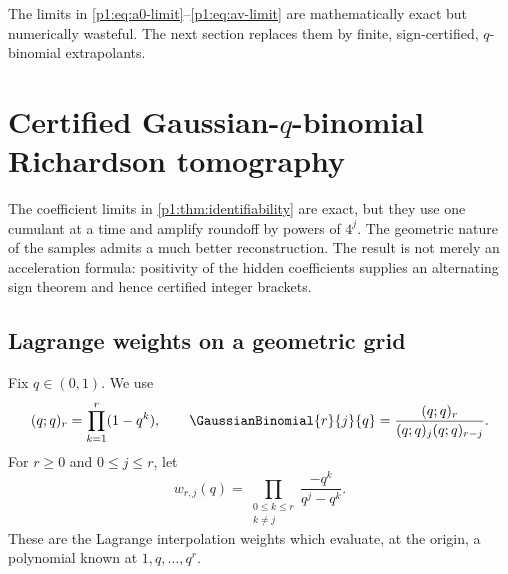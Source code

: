 \documentclass[11pt,oneside]{article}
\numberwithin{equation}{section}
\theoremstyle{definition}
\theoremstyle{remark}
\begin{document}
\begin{remark}
The limits in \eqref{p1:eq:a0-limit}--\eqref{p1:eq:av-limit} are mathematically exact but
numerically wasteful.  The next section replaces them by finite, sign-certified,
$q$-binomial extrapolants.
\end{remark}

\section{Certified Gaussian-$q$-binomial Richardson tomography}
\label{p1:sec:tomography}

The coefficient limits in \cref{p1:thm:identifiability} are exact, but they use one cumulant at
a time and amplify roundoff by powers of $4^j$.  The geometric nature of the samples admits
a much better reconstruction.  The result is not merely an acceleration formula: positivity
of the hidden coefficients supplies an alternating sign theorem and hence certified integer
brackets.

\subsection{Lagrange weights on a geometric grid}

Fix $q\in(0,1)$.  We use
\[
 (q;q)_r=\prod_{k=1}^{r}(1-q^k),
 \qquad
 \GaussianBinomial{r}{j}{q}=\frac{(q;q)_r}{(q;q)_j(q;q)_{r-j}}.
\]
For $r\ge0$ and $0\le j\le r$, let
\begin{equation}
 w_{r,j}(q)
 =\prod_{\substack{0\le k\le r\\k\ne j}}
   \frac{-q^k}{q^j-q^k}.
 \label{p1:eq:lagrange-weight-product}
\end{equation}
These are the Lagrange interpolation weights which evaluate, at the origin, a polynomial
known at $1,q,\ldots,q^r$.
\end{document}
